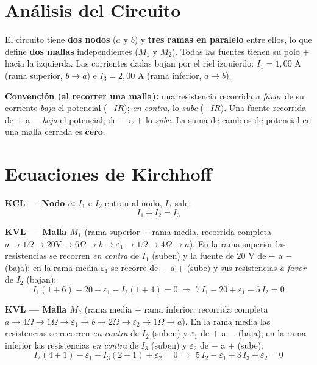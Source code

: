 \documentclass[12pt,letterpaper]{article}
\begin{document}
\section*{An\'alisis del Circuito}

El circuito tiene \textbf{dos nodos} ($a$ y $b$) y \textbf{tres ramas en paralelo} entre ellos, lo
que define \textbf{dos mallas} independientes ($M_1$ y $M_2$). Todas las fuentes tienen su polo $+$
hacia la izquierda. Las corrientes dadas bajan por el riel izquierdo: $I_1=1{,}00$ A (rama superior,
$b\!\to\! a$) e $I_3=2{,}00$ A (rama inferior, $a\!\to\! b$).

\medskip
\noindent\textbf{Convenci\'on (al recorrer una malla):} una resistencia recorrida \emph{a favor}
de su corriente \emph{baja} el potencial ($-IR$); \emph{en contra}, lo \emph{sube} ($+IR$). Una
fuente recorrida de $+$ a $-$ \emph{baja} el potencial; de $-$ a $+$ lo \emph{sube}. La suma de
cambios de potencial en una malla cerrada es \textbf{cero}.

\section*{Ecuaciones de Kirchhoff}

\textbf{KCL --- Nodo $a$:} $I_1$ e $I_2$ entran al nodo, $I_3$ sale:
\[
    \boxed{I_1 + I_2 = I_3} \tag{N}
\]

\medskip
\textbf{KVL --- Malla $M_1$} (rama superior $+$ rama media, recorrida completa
$a\to\!1\Omega\!\to\!20\text{V}\!\to\!6\Omega\to b\to\varepsilon_1\to\!1\Omega\!\to\!4\Omega\to a$).
En la rama superior las resistencias se recorren \emph{en contra} de $I_1$ (suben) y la fuente de
$20$ V de $+$ a $-$ (baja); en la rama media $\varepsilon_1$ se recorre de $-$ a $+$ (sube) y sus
resistencias \emph{a favor} de $I_2$ (bajan):
\[
    I_1(1+6) - 20 + \varepsilon_1 - I_2(1+4) = 0
    \;\Rightarrow\;
    \boxed{7\,I_1 - 20 + \varepsilon_1 - 5\,I_2 = 0} \tag{M1}
\]

\medskip
\textbf{KVL --- Malla $M_2$} (rama media $+$ rama inferior, recorrida completa
$a\to\!4\Omega\!\to\!1\Omega\!\to\!\varepsilon_1\to b\to\!2\Omega\!\to\!\varepsilon_2\!\to\!1\Omega\to a$).
En la rama media las resistencias se recorren \emph{en contra} de $I_2$ (suben) y $\varepsilon_1$ de
$+$ a $-$ (baja); en la rama inferior las resistencias \emph{en contra} de $I_3$ (suben) y
$\varepsilon_2$ de $-$ a $+$ (sube):
\[
    I_2(4+1) - \varepsilon_1 + I_3(2+1) + \varepsilon_2 = 0
    \;\Rightarrow\;
    \boxed{5\,I_2 - \varepsilon_1 + 3\,I_3 + \varepsilon_2 = 0} \tag{M2}
\]
\end{document}
